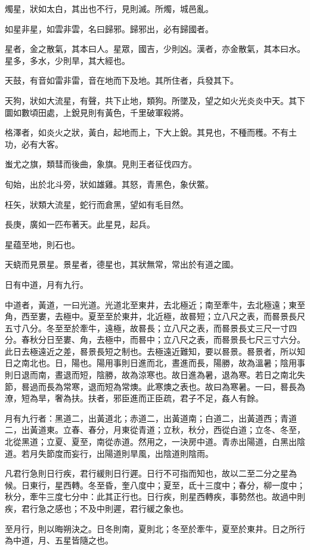 \begin{pinyinscope}
燭星，狀如太白，其出也不行，見則滅。所燭，城邑亂。

如星非星，如雲非雲，名曰歸邪。歸邪出，必有歸國者。

星者，金之散氣，其本曰人。星眾，國吉，少則凶。漢者，亦金散氣，其本曰水。星多，多水，少則旱，其大經也。

天鼓，有音如雷非雷，音在地而下及地。其所住者，兵發其下。

天狗，狀如大流星，有聲，共下止地，類狗。所墜及，望之如火光炎炎中天。其下圜如數頃田處，上銳見則有黃色，千里破軍殺將。

格澤者，如炎火之狀，黃白，起地而上，下大上銳。其見也，不種而穫。不有土功，必有大客。

蚩尤之旗，類彗而後曲，象旗。見則王者征伐四方。

旬始，出於北斗旁，狀如雄雞。其怒，青黑色，象伏鱉。

枉矢，狀類大流星，蛇行而倉黑，望如有毛目然。

長庚，廣如一匹布著天。此星見，起兵。

星蕴至地，則石也。

天蛲而見景星。景星者，德星也，其狀無常，常出於有道之國。

日有中道，月有九行。

中道者，黃道，一曰光道。光道北至東井，去北極近；南至牽牛，去北極遠；東至角，西至婁，去極中。夏至至於東井，北近極，故晷短；立八尺之表，而晷景長尺五寸八分。冬至至於牽牛，遠極，故晷長；立八尺之表，而晷景長丈三尺一寸四分。春秋分日至婁、角，去極中，而晷中；立八尺之表，而晷景長七尺三寸六分。此日去極遠近之差，晷景長短之制也。去極遠近難知，要以晷景。晷景者，所以知日之南北也。日，陽也。陽用事則日進而北，晝進而長，陽勝，故為溫暑；陰用事則日退而南，晝退而短，陰勝，故為涼寒也。故日進為暑，退為寒。若日之南北失節，晷過而長為常寒，退而短為常燠。此寒燠之表也。故曰為寒暑。一曰，晷長為潦，短為旱，奢為扶。扶者，邪臣進而正臣疏，君子不足，姦人有餘。

月有九行者：黑道二，出黃道北；赤道二，出黃道南；白道二，出黃道西；青道二，出黃道東。立春、春分，月東從青道；立秋，秋分，西從白道；立冬、冬至，北從黑道；立夏、夏至，南從赤道。然用之，一決房中道。青赤出陽道，白黑出陰道。若月失節度而妄行，出陽道則旱風，出陰道則陰雨。

凡君行急則日行疾，君行緩則日行遲。日行不可指而知也，故以二至二分之星為候。日東行，星西轉。冬至昏，奎八度中；夏至，氐十三度中；春分，柳一度中；秋分，牽牛三度七分中：此其正行也。日行疾，則星西轉疾，事勢然也。故過中則疾，君行急之感也；不及中則遲，君行緩之象也。

至月行，則以晦朔決之。日冬則南，夏則北；冬至於牽牛，夏至於東井。日之所行為中道，月、五星皆隨之也。


\end{pinyinscope}
